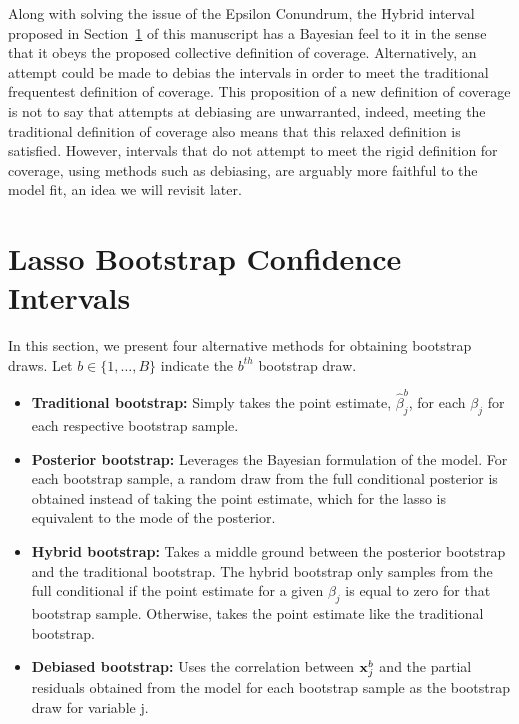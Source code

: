 Along with solving the issue of the Epsilon Conundrum, the Hybrid interval proposed in Section~\ref{Sec:methods}  of this manuscript has a Bayesian feel to it in the sense that it obeys the proposed collective definition of coverage. Alternatively, an attempt could be made to debias the intervals in order to meet the traditional frequentest definition of coverage. This proposition of a new definition of coverage is not to say that attempts at debiasing are unwarranted, indeed, meeting the traditional definition of coverage also means that this relaxed definition is satisfied. However, intervals that do not attempt to meet the rigid definition for coverage, using methods such as debiasing, are arguably more faithful to the model fit, an idea we will revisit later. 


\section{Lasso Bootstrap Confidence Intervals}\label{Sec:methods}

In this section, we present four alternative methods for obtaining bootstrap draws. Let $b \in \lbrace 1, \ldots, B \rbrace$ indicate the $b^{th}$ bootstrap draw.

\begin{itemize}
\item \textbf{Traditional bootstrap:} Simply takes the point estimate, $\hat{\beta}_j^b$,  for each $\beta_j$ for each respective bootstrap sample.
\item \textbf{Posterior bootstrap:} Leverages the Bayesian formulation of the model. For each bootstrap sample, a random draw from the full conditional posterior is obtained instead of taking the point estimate, which for the lasso is equivalent to the mode of the posterior.
\item \textbf{Hybrid bootstrap:} Takes a middle ground between the posterior bootstrap and the traditional bootstrap. The hybrid bootstrap only samples from the full conditional if the point estimate for a given $\beta_j$ is equal to zero for that bootstrap sample. Otherwise, takes the point estimate like the traditional bootstrap.
\item \textbf{Debiased bootstrap:} Uses the correlation between $\boldsymbol{\mathbf{x}}^b_j$ and the partial residuals obtained from the model for each bootstrap sample as the bootstrap draw for variable j.
\end{itemize}

